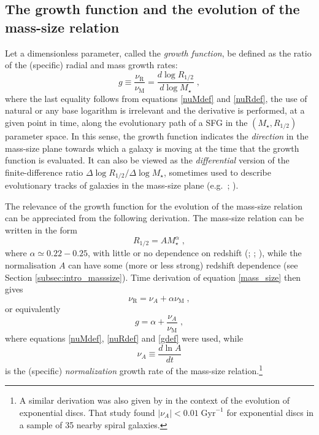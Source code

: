 \documentclass[fleqn,usenatbib]{mnras}
\begin{document}
\subsection{The growth function and the evolution of the mass-size relation}\label{subsec:growthfunction}

Let a dimensionless parameter, called the \emph{growth function}, be defined as the ratio of the (specific) radial and mass growth rates:
\begin{equation}\label{gdef}
g \equiv \frac{\nu_\textrm{R}}{\nu_\textrm{M}} = \frac{d \log R_{1/2}}{d \log M_\star}\; ,
\end{equation}
where the last equality follows from equations \eqref{nuMdef} and \eqref{nuRdef}, the use of natural or any base logarithm is irrelevant and the derivative is performed, at a given point in time, along the evolutionary path of a SFG in the $(M_\star, R_{1/2})$ parameter space. In this sense, the growth function indicates the \emph{direction} in the mass-size plane towards which a galaxy is moving at the time that the growth function is evaluated. It can also be viewed as the \emph{differential} version of the finite-difference ratio $\Delta \log R_{1/2}/\Delta \log M_\star$, sometimes used to describe evolutionary tracks of galaxies in the mass-size plane (e.g.\ \citealt{vanDokkum+15}; \citealt{Wilman+20}).

The relevance of the growth function for the evolution of the mass-size relation can be appreciated from the following derivation. The mass-size relation can be written in the form
\begin{equation}\label{mass_size}
R_{1/2} = A M_\star^\alpha \; ,
\end{equation}
where $\alpha \simeq 0.22-0.25$, with little or no dependence on redshift (\citealt{Lange+15}; \citealt{vdW+14}; \citealt{Nedkova+21}), while the normalisation $A$ can have some (more or less strong) redshift dependence (see Section \ref{subsec:intro_masssize}). Time derivation of equation \eqref{mass_size} then gives
\begin{equation}\label{derivation1}
\nu_\textrm{R} = \nu_A  + \alpha \nu_\textrm{M} \; ,
\end{equation}
or equivalently
\begin{equation}\label{derivation2}
g = \alpha + \frac{\nu_A}{\nu_\textrm{M}} \; ,
\end{equation}
where equations \eqref{nuMdef}, \eqref{nuRdef} and \eqref{gdef} were used, while
\begin{equation}\label{nuAdef}
\nu_A \equiv \frac{d \ln A}{dt}
\end{equation}
is the (specific) \emph{normalization} growth rate of the mass-size relation.\footnote{A similar derivation was also given by \cite{P+15} in the context of the evolution of exponential discs. That study found $|\nu_A| < 0.01 \; \textrm{Gyr}^{-1}$ for exponential discs in a sample of 35 nearby spiral galaxies.}
\end{document}

